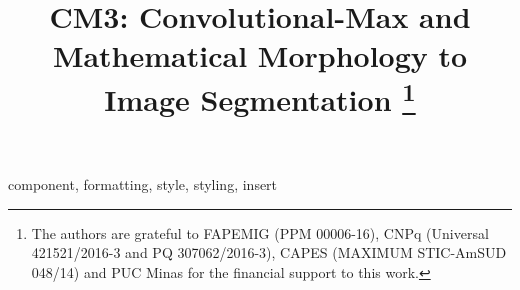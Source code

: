 \documentclass[conference]{IEEEtran}
\begin{document}
\title{CM3: Convolutional-Max and Mathematical Morphology to Image Segmentation
\thanks{The authors are grateful to FAPEMIG (PPM 00006-16), CNPq (Universal 421521/2016-3 and PQ 307062/2016-3), CAPES (MAXIMUM STIC-AmSUD 048/14) and PUC Minas for the financial support to this work.}
}

\author{
}

\maketitle

\begin{abstract}

\end{abstract}

\begin{IEEEkeywords}
component, formatting, style, styling, insert
\end{IEEEkeywords}











\end{document}
